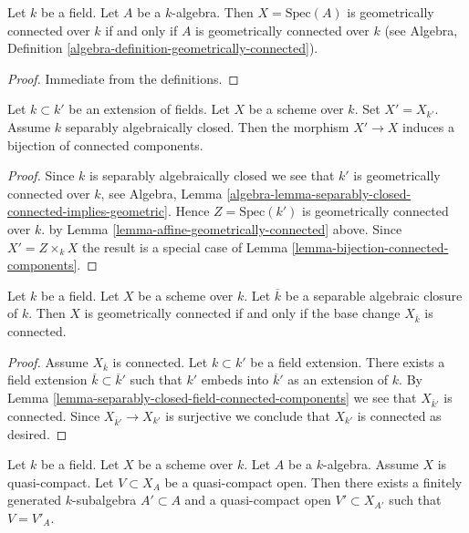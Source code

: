 \begin{lemma}
\label{lemma-affine-geometrically-connected}
Let $k$ be a field.
Let $A$ be a $k$-algebra.
Then $X = \text{Spec}(A)$ is geometrically connected over $k$
if and only if $A$ is geometrically connected over $k$ (see
Algebra, Definition \ref{algebra-definition-geometrically-connected}).
\end{lemma}

\begin{proof}
Immediate from the definitions.
\end{proof}

\begin{lemma}
\label{lemma-separably-closed-field-connected-components}
Let $k \subset k'$ be an extension of fields.
Let $X$ be a scheme over $k$. Set $X' = X_{k'}$.
Assume $k$ separably algebraically closed.
Then the morphism $X' \to X$ induces a bijection of connected
components.
\end{lemma}

\begin{proof}
Since $k$ is separably algebraically closed we see that
$k'$ is geometrically connected over $k$, see Algebra,
Lemma \ref{algebra-lemma-separably-closed-connected-implies-geometric}.
Hence $Z = \text{Spec}(k')$ is geometrically connected over $k$.
by Lemma \ref{lemma-affine-geometrically-connected} above.
Since $X' = Z \times_k X$ the result is a special case
of Lemma \ref{lemma-bijection-connected-components}.
\end{proof}

\begin{lemma}
\label{lemma-characterize-geometrically-connected}
Let $k$ be a field.
Let $X$ be a scheme over $k$.
Let $\overline{k}$ be a separable algebraic closure of $k$.
Then $X$ is geometrically connected if and only if the base change
$X_{\overline{k}}$ is connected.
\end{lemma}

\begin{proof}
Assume $X_{\overline{k}}$ is connected.
Let $k \subset k'$ be a field extension.
There exists a field extension $\overline{k} \subset \overline{k}'$
such that $k'$ embeds into $\overline{k}'$ as an extension of $k$.
By Lemma \ref{lemma-separably-closed-field-connected-components}
we see that $X_{\overline{k}'}$ is connected.
Since $X_{\overline{k}'} \to X_{k'}$ is surjective we conclude
that $X_{k'}$ is connected as desired.
\end{proof}

\begin{lemma}
\label{lemma-descend-open}
Let $k$ be a field.
Let $X$ be a scheme over $k$.
Let $A$ be a $k$-algebra.
Assume $X$ is quasi-compact.
Let $V \subset X_A$ be a quasi-compact open.
Then there exists a finitely generated $k$-subalgebra $A' \subset A$
and a quasi-compact open $V' \subset X_{A'}$
such that $V = V'_A$.
\end{lemma}

